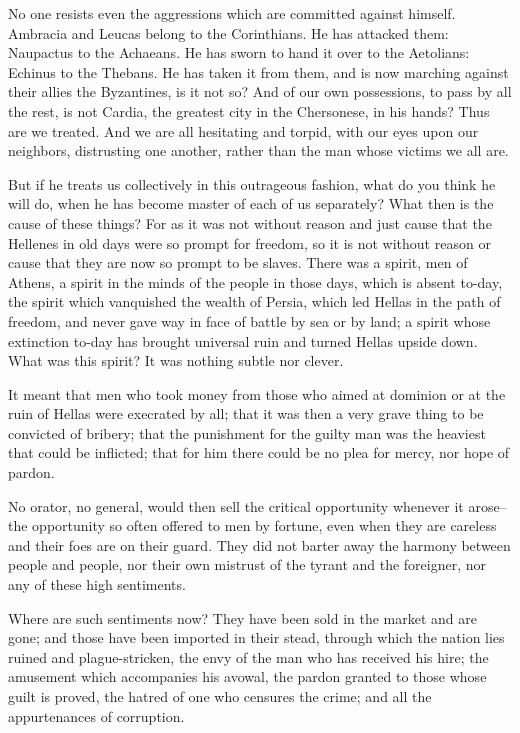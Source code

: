 \documentclass[a4paper]{amsbook}
\begin{document}
No one resists even the aggressions which are committed against himself. Ambracia and Leucas belong to the Corinthians. He has attacked them: Naupactus to the Achaeans. He has sworn to hand it over to the Aetolians: Echinus to the Thebans. He has taken it from them, and is now marching against their allies the Byzantines, is it not so? And of our own possessions, to pass by all the rest, is not Cardia, the greatest city in the Chersonese, in his hands? Thus are we treated. And we are all hesitating and torpid, with our eyes upon our neighbors, distrusting one another, rather than the man whose victims we all are.

But if he treats us collectively in this outrageous fashion, what do you think he will do, when he has become master of each of us separately? What then is the cause of these things? For as it was not without reason and just cause that the Hellenes in old days were so prompt for freedom, so it is not without reason or cause that they are now so prompt to be slaves. There was a spirit, men of Athens, a spirit in the minds of the people in those days, which is absent to-day, the spirit which vanquished the wealth of Persia, which led Hellas in the path of freedom, and never gave way in face of battle by sea or by land; a spirit whose extinction to-day has brought universal ruin and turned Hellas upside down. What was this spirit? It was nothing subtle nor clever.

It meant that men who took money from those who aimed at dominion or at the ruin of Hellas were execrated by all; that it was then a very grave thing to be convicted of bribery; that the punishment for the guilty man was the heaviest that could be inflicted; that for him there could be no plea for mercy, nor hope of pardon.

No orator, no general, would then sell the critical opportunity whenever it arose--the opportunity so often offered to men by fortune, even when they are careless and their foes are on their guard. They did not barter away the harmony between people and people, nor their own mistrust of the tyrant and the foreigner, nor any of these high sentiments.

Where are such sentiments now? They have been sold in the market and are gone; and those have been imported in their stead, through which the nation lies ruined and plague-stricken, the envy of the man who has received his hire; the amusement which accompanies his avowal, the pardon granted to those whose guilt is proved, the hatred of one who censures the crime; and all the appurtenances of corruption.
\end{document}
